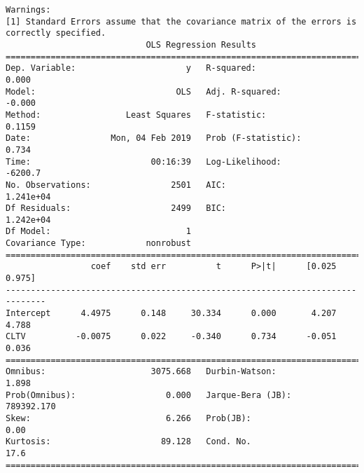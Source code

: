 \documentclass[11pt]{article}
\begin{document}
\begin{Verbatim}[commandchars=\\\{\}]
Warnings:
[1] Standard Errors assume that the covariance matrix of the errors is correctly specified.
                            OLS Regression Results                            
==============================================================================
Dep. Variable:                      y   R-squared:                       0.000
Model:                            OLS   Adj. R-squared:                 -0.000
Method:                 Least Squares   F-statistic:                    0.1159
Date:                Mon, 04 Feb 2019   Prob (F-statistic):              0.734
Time:                        00:16:39   Log-Likelihood:                -6200.7
No. Observations:                2501   AIC:                         1.241e+04
Df Residuals:                    2499   BIC:                         1.242e+04
Df Model:                           1                                         
Covariance Type:            nonrobust                                         
==============================================================================
                 coef    std err          t      P>|t|      [0.025      0.975]
------------------------------------------------------------------------------
Intercept      4.4975      0.148     30.334      0.000       4.207       4.788
CLTV          -0.0075      0.022     -0.340      0.734      -0.051       0.036
==============================================================================
Omnibus:                     3075.668   Durbin-Watson:                   1.898
Prob(Omnibus):                  0.000   Jarque-Bera (JB):           789392.170
Skew:                           6.266   Prob(JB):                         0.00
Kurtosis:                      89.128   Cond. No.                         17.6
==============================================================================


\end{Verbatim}
\end{document}
